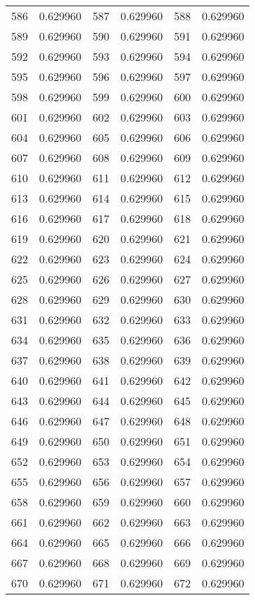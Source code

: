 \documentclass[12pt]{article}
\begin{document}
\begin{longtable}{@{}cc|cc|cc@{}}
586 & 0.629960 & 587 & 0.629960 & 588 & 0.629960 \\
589 & 0.629960 & 590 & 0.629960 & 591 & 0.629960 \\
592 & 0.629960 & 593 & 0.629960 & 594 & 0.629960 \\
595 & 0.629960 & 596 & 0.629960 & 597 & 0.629960 \\
598 & 0.629960 & 599 & 0.629960 & 600 & 0.629960 \\
601 & 0.629960 & 602 & 0.629960 & 603 & 0.629960 \\
604 & 0.629960 & 605 & 0.629960 & 606 & 0.629960 \\
607 & 0.629960 & 608 & 0.629960 & 609 & 0.629960 \\
610 & 0.629960 & 611 & 0.629960 & 612 & 0.629960 \\
613 & 0.629960 & 614 & 0.629960 & 615 & 0.629960 \\
616 & 0.629960 & 617 & 0.629960 & 618 & 0.629960 \\
619 & 0.629960 & 620 & 0.629960 & 621 & 0.629960 \\
622 & 0.629960 & 623 & 0.629960 & 624 & 0.629960 \\
625 & 0.629960 & 626 & 0.629960 & 627 & 0.629960 \\
628 & 0.629960 & 629 & 0.629960 & 630 & 0.629960 \\
631 & 0.629960 & 632 & 0.629960 & 633 & 0.629960 \\
634 & 0.629960 & 635 & 0.629960 & 636 & 0.629960 \\
637 & 0.629960 & 638 & 0.629960 & 639 & 0.629960 \\
640 & 0.629960 & 641 & 0.629960 & 642 & 0.629960 \\
643 & 0.629960 & 644 & 0.629960 & 645 & 0.629960 \\
646 & 0.629960 & 647 & 0.629960 & 648 & 0.629960 \\
649 & 0.629960 & 650 & 0.629960 & 651 & 0.629960 \\
652 & 0.629960 & 653 & 0.629960 & 654 & 0.629960 \\
655 & 0.629960 & 656 & 0.629960 & 657 & 0.629960 \\
658 & 0.629960 & 659 & 0.629960 & 660 & 0.629960 \\
661 & 0.629960 & 662 & 0.629960 & 663 & 0.629960 \\
664 & 0.629960 & 665 & 0.629960 & 666 & 0.629960 \\
667 & 0.629960 & 668 & 0.629960 & 669 & 0.629960 \\
670 & 0.629960 & 671 & 0.629960 & 672 & 0.629960 \\

\end{longtable}
\end{document}
